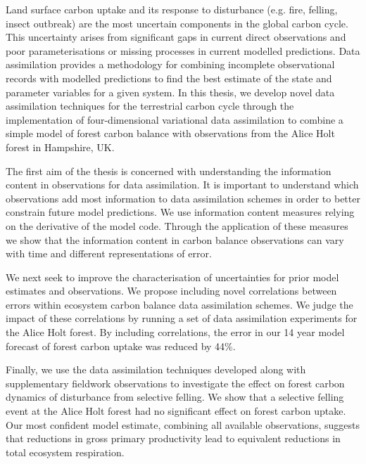 Land surface carbon uptake and its response to disturbance (e.g. fire, felling, insect outbreak) are the most uncertain components in the global carbon cycle. This uncertainty arises from significant gaps in current direct observations and poor parameterisations or missing processes in current modelled predictions. Data assimilation provides a methodology for combining incomplete observational records with modelled predictions to find the best estimate of the state and parameter variables for a given system. In this thesis, we develop novel data assimilation techniques for the terrestrial carbon cycle through the implementation of four-dimensional variational data assimilation to combine a simple model of forest carbon balance with observations from the Alice Holt forest in Hampshire, UK.

The first aim of the thesis is concerned with understanding the information content in observations for data assimilation. It is important to understand which observations add most information to data assimilation schemes in order to better constrain future model predictions. We use information content measures relying on the derivative of the model code. Through the application of these measures we show that the information content in carbon balance observations can vary with time and different representations of error. 

We next seek to improve the characterisation of uncertainties for prior model estimates and observations. We propose including novel correlations between errors within ecosystem carbon balance data assimilation schemes. We judge the impact of these correlations by running a set of data assimilation experiments for the Alice Holt forest. By including correlations, the error in our 14 year model forecast of forest carbon uptake was reduced by 44\%.

Finally, we use the data assimilation techniques developed along with supplementary fieldwork observations to investigate the effect on forest carbon dynamics of disturbance from selective felling. We show that a selective felling event at the Alice Holt forest had no significant effect on forest carbon uptake. Our most confident model estimate, combining all available observations, suggests that reductions in gross primary productivity lead to equivalent reductions in total ecosystem respiration. 
   

